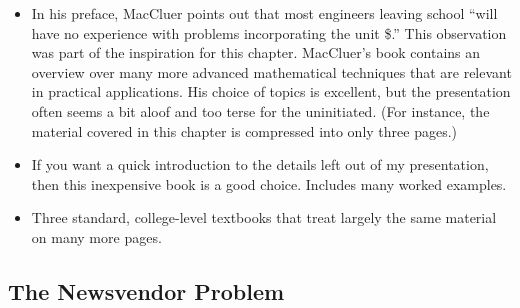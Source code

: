 \begin{itemize}
\item {}
  In his preface, MacCluer points out that most engineers leaving
  school ``will have no experience with problems incorporating the
  unit \$.'' This observation was part of the inspiration for this
  chapter. MacCluer's book contains an overview over many more
  advanced mathematical techniques that are relevant in practical
  applications.  His choice of topics is excellent, but the
  presentation often seems a bit aloof and too terse for the
  uninitiated. (For instance, the material covered in this chapter is
  compressed into only three pages.)

\item {}
  If you want a quick introduction to the details left out of my
  presentation, then this inexpensive book is a good choice. Includes
  many worked examples.

\item {} 
  \vfill\pagebreak 
  Three standard, college-level textbooks that treat largely the same
  material on many more pages.

\end{itemize}

\subsection{The Newsvendor Problem}

